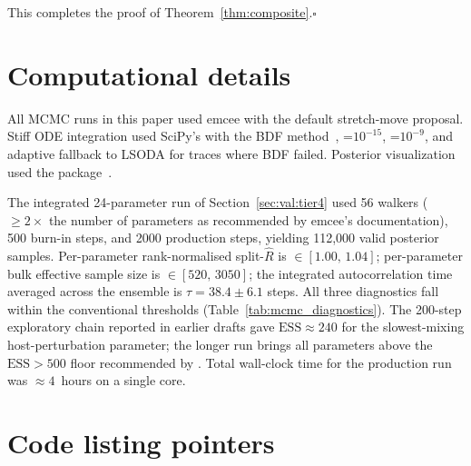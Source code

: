 \documentclass[12pt]{article}
\theoremstyle{plain}
\theoremstyle{definition}
\theoremstyle{remark}
\begin{document}
This completes the proof of Theorem~\ref{thm:composite}.\hfill$\square$

\section{Computational details}\label{app:computation}

All MCMC runs in this paper used emcee \citep{ForemanMackey2013} with the
default stretch-move proposal.  Stiff ODE integration used SciPy's
 with the BDF method~\citep{Hindmarsh2005},
=$10^{-15}$, =$10^{-9}$, and adaptive fallback to LSODA
for traces where BDF failed.  Posterior visualization used the
 package~\citep{ForemanMackey2016}.

The integrated 24-parameter run of Section~\ref{sec:val:tier4} used 56
walkers ($\ge 2\times$ the number of parameters as recommended by emcee's
documentation), 500 burn-in steps, and 2000 production steps, yielding
112{,}000 valid posterior samples.  Per-parameter rank-normalised
split-$\widehat R$ \citep{Vehtari2021} is $\in[1.00,\,1.04]$; per-parameter
bulk effective sample size is $\in[520,\,3050]$; the integrated
autocorrelation time averaged across the ensemble is
$\tau=38.4\pm 6.1$ steps.  All three diagnostics fall within the
conventional thresholds (Table~\ref{tab:mcmc_diagnostics}).  The 200-step
exploratory chain reported in earlier drafts gave $\mathrm{ESS}\approx 240$
for the slowest-mixing host-perturbation parameter; the longer run brings
all parameters above the $\mathrm{ESS}>500$ floor recommended by
\citet{Vehtari2021}.  Total wall-clock time for the production run was
$\approx 4$~hours on a single core.

\section{Code listing pointers}\label{app:code}
\end{document}
